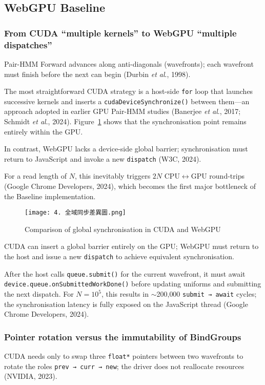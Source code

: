 \documentclass[PhD]{PHlab-thesis}
\begin{document}
\subsection{WebGPU Baseline}

\subsubsection{From CUDA “multiple kernels” to WebGPU “multiple dispatches”}
Pair-HMM Forward advances along anti-diagonals (wavefronts); each wavefront must finish before the next can begin (Durbin \emph{et al}., 1998).

The most straightforward CUDA strategy is a host-side \texttt{for} loop that launches successive kernels and inserts a \texttt{cudaDeviceSynchronize()} between them—an approach adopted in earlier GPU Pair-HMM studies (Banerjee \emph{et al}., 2017; Schmidt \emph{et al}., 2024). Figure~\ref{fig:global-sync-diff} shows that the synchronisation point remains entirely within the GPU.

In contrast, WebGPU lacks a device-side global barrier; synchronisation must return to JavaScript and invoke a new \texttt{dispatch} (W3C, 2024).

For a read length of $N$, this inevitably triggers $2N$ CPU$\leftrightarrow$GPU round-trips (Google Chrome Developers, 2024), which becomes the first major bottleneck of the Baseline implementation.

\begin{figure}[htbp]
    \centering
    \texttt{[image: 4. 全域同步差異圖.png]}
    \caption{Comparison of global synchronisation in CUDA and WebGPU}
    \label{fig:global-sync-diff}
\end{figure}

CUDA can insert a global barrier entirely on the GPU; WebGPU must return to the host and issue a new \texttt{dispatch} to achieve equivalent synchronisation.

After the host calls \texttt{queue.submit()} for the current wavefront, it must await \texttt{device.queue.onSubmittedWorkDone()} before updating uniforms and submitting the next dispatch.  
For $N = 10^{5}$, this results in $\sim$200{,}000 \texttt{submit → await} cycles; the synchronisation latency is fully exposed on the JavaScript thread (Google Chrome Developers, 2024).

\subsubsection{Pointer rotation versus the immutability of BindGroups}
CUDA needs only to swap three \texttt{float*} pointers between two wavefronts to rotate the roles \texttt{prev → curr → new}; the driver does not reallocate resources (NVIDIA, 2023).
\end{document}
